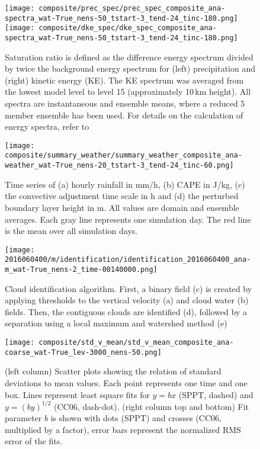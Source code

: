 \documentclass[a4paper, 12pt]{article}
\begin{document}
\begin{figure}[h!]
\noindent \centering
\texttt{[image: composite/prec\_spec/prec\_spec\_composite\_ana-spectra\_wat-True\_nens-50\_tstart-3\_tend-24\_tinc-180.png]}
\texttt{[image: composite/dke\_spec/dke\_spec\_composite\_ana-spectra\_wat-True\_nens-50\_tstart-3\_tend-24\_tinc-180.png]}\\
\caption{Saturation ratio is defined as the difference energy spectrum divided by twice the background energy spectrum for (left) precipitation and (right) kinetic energy (KE). The KE spectrum was averaged from the lowest model level to level 15 (approximately 10\,km height). All spectra are instantaneous and ensemble means, where a reduced 5 member ensemble has been used. For details on the calculation of energy spectra, refer to \cite{Selz2015b}} \label{fig:spectra}
\end{figure}

\begin{figure}[h!]
\noindent \centering
\texttt{[image: composite/summary\_weather/summary\_weather\_composite\_ana-weather\_wat-True\_nens-20\_tstart-3\_tend-24\_tinc-60.png]}\\
\caption{Time series of (a) hourly rainfall in mm/h, (b) CAPE in J/kg, (c) the convective adjustment time scale in h and (d) the perturbed boundary layer height in m. All values are domain and ensemble averages. Each gray line represents one simulation day. The red line is the mean over all simulation days.} \label{fig:summary_weather}
\end{figure}

\begin{figure}[ht]
\noindent \centering
\texttt{[image: 2016060400/m/identification/identification\_2016060400\_ana-m\_wat-True\_nens-2\_time-00140000.png]}\\
\caption{Cloud identification algorithm. First, a binary field (c) is created by applying thresholds to the vertical velocity (a) and cloud water (b) fields. Then, the contiguous clouds are identified (d), followed by a separation using a local maximum and watershed method (e)} \label{fig:Fig4}
\end{figure}


\begin{figure}[ht]
\noindent \centering
\texttt{[image: composite/std\_v\_mean/std\_v\_mean\_composite\_ana-coarse\_wat-True\_lev-3000\_nens-50.png]}\\
\caption{(left column) Scatter plots showing the relation of standard deviations to mean values. Each point represents one time and one box. Lines represent least square fits for $y=bx$ (SPPT, dashed) and $y = (by)^{1/2}$ (CC06, dash-dot). (right column top and bottom) Fit parameter $b$ is shown with dots (SPPT) and crosses (CC06, multiplied by a factor), error bars represent the normalized RMS error of the fits.} \label{fig:std_v_mean}
\end{figure}
\end{document}

